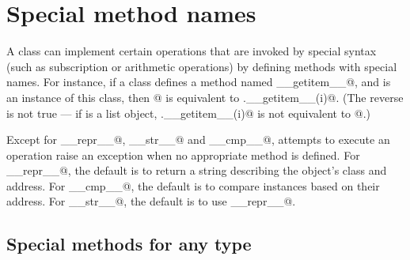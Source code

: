 \section{Special method names} \label{specialnames}

A class can implement certain operations that are invoked by special
syntax (such as subscription or arithmetic operations) by defining
methods with special names.  For instance, if a class defines a
method named \verb@__getitem__@, and \verb@x@ is an instance of this
class, then \verb@x[i]@ is equivalent to \verb@x.__getitem__(i)@.
(The reverse is not true --- if \verb@x@ is a list object,
\verb@x.__getitem__(i)@ is not equivalent to \verb@x[i]@.)

Except for \verb@__repr__@, \verb@__str__@ and \verb@__cmp__@,
attempts to execute an
operation raise an exception when no appropriate method is defined.
For \verb@__repr__@, the default is to return a string describing the
object's class and address.
For \verb@__cmp__@, the default is to compare instances based on their
address.
For \verb@__str__@, the default is to use \verb@__repr__@.


\subsection{Special methods for any type}

